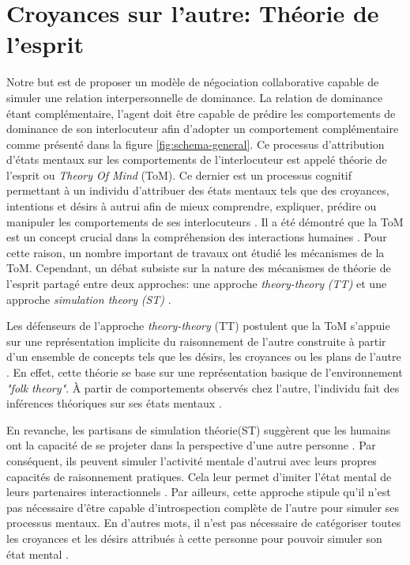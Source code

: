 \section{Croyances sur l'autre: Théorie de l'esprit}
Notre but est de proposer un modèle de négociation collaborative capable de simuler une relation interpersonnelle de dominance. La relation de dominance étant complémentaire, l'agent doit être capable de prédire les comportements de dominance de son interlocuteur afin d'adopter un comportement complémentaire comme présenté dans la figure \ref{fig:schema-general}. 
Ce processus d'attribution d'états mentaux sur les comportements de l'interlocuteur est appelé théorie de l'esprit ou \emph{Theory Of Mind} (ToM). Ce dernier est un processus cognitif permettant à un individu d'attribuer des états mentaux tels que des croyances, intentions et désirs à autrui afin de mieux comprendre, expliquer, prédire ou manipuler les comportements de ses interlocuteurs \cite{harbers2012modeling}. Il a été démontré que la ToM est un concept crucial dans la compréhension des interactions humaines \cite{whiten1991natural,byom2013theory}. Pour cette raison, un nombre important de travaux ont étudié les mécanismes de la ToM. Cependant, un débat subsiste sur la nature des mécanismes de théorie de l’esprit partagé entre deux approches: une approche \textit{theory-theory}  \emph{(TT)} et une approche \textit{simulation theory} \emph{(ST)} \cite{harbers2012modeling,shanton2010simulation}.

Les défenseurs de l'approche \textit{theory-theory} (TT) postulent que la ToM s’appuie sur une représentation implicite du raisonnement de l'autre construite à partir d'un ensemble de concepts tels que les désirs, les croyances ou les plans de l'autre \cite{harbers2012modeling}. En effet, cette théorie se base sur une représentation basique de l'environnement \emph{"folk theory"}. À partir de comportements observés chez l'autre, l'individu fait des inférences théoriques sur ses états mentaux \cite{shanton2010simulation}.

En revanche, les partisans de simulation théorie(ST) suggèrent que les humains ont la capacité de se projeter dans la perspective d'une autre personne \cite{shanton2010simulation}.
Par conséquent, ils peuvent simuler l'activité mentale d'autrui avec leurs propres capacités de raisonnement pratiques. Cela leur permet d'imiter l'état mental de leurs partenaires interactionnels \cite{harbers2009modeling}.
Par ailleurs, cette approche stipule qu'il n'est pas nécessaire d'être capable d'introspection complète de l'autre pour simuler ses processus mentaux. En d'autres mots, il n'est pas nécessaire de catégoriser toutes les croyances et les désirs attribués à cette personne pour pouvoir simuler son état mental \cite{harbers2012modeling}.

